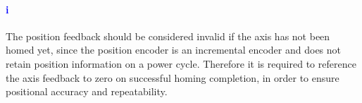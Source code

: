 \paragraph*{\textbf{\LARGE \textcolor{blue}{i}}}The position feedback should be considered invalid if the axis has not been homed yet, since the position encoder is an incremental encoder and does not retain position information on a power cycle. Therefore it is required to reference the axis feedback to zero on successful homing completion, in order to ensure positional accuracy and repeatability.
\\
\\
\pagebreak
\nopagebreak
